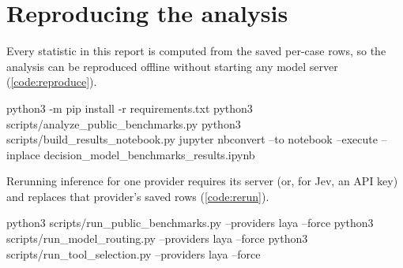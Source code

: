 \documentclass[11pt,a4paper]{article}
\begin{document}
\clearpage
\section{Reproducing the analysis}\label{app:reproduce}

Every statistic in this report is computed from the saved per-case rows, so the analysis can be
reproduced offline without starting any model server (\cref{code:reproduce}).

\begin{brandcode}[lang=bash, caption={Recomputing the statistics, notebook, figures, and tables from the saved results\label{code:reproduce}}]
python3 -m pip install -r requirements.txt
python3 scripts/analyze_public_benchmarks.py
python3 scripts/build_results_notebook.py
jupyter nbconvert --to notebook --execute --inplace decision_model_benchmarks_results.ipynb
\end{brandcode}

Rerunning inference for one provider requires its server (or, for Jev, an API key) and replaces that
provider's saved rows (\cref{code:rerun}).

\begin{brandcode}[lang=bash, caption={Rerunning all three runners for one provider while its server is up\label{code:rerun}}]
python3 scripts/run_public_benchmarks.py --providers laya --force
python3 scripts/run_model_routing.py --providers laya --force
python3 scripts/run_tool_selection.py --providers laya --force
\end{brandcode}

\brandcta
\end{document}
